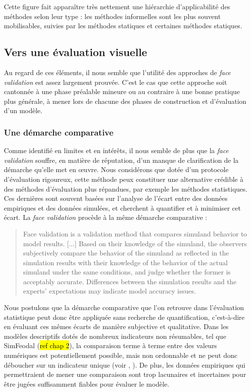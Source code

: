 Cette figure fait apparaître très nettement une \og hiérarchie\fg{} d'applicabilité des méthodes selon leur type : les méthodes informelles sont les plus souvent mobilisables, suivies par les méthodes statiques et certaines méthodes statiques.

\subsection{Vers une évaluation visuelle}

Au regard de ces éléments, il nous semble que l'utilité des approches de \textit{face validation} est assez largement prouvée.
C'est le cas que cette approche soit cantonnée à une phase préalable mineure ou au contraire à une bonne pratique plus générale, à mener lors de chacune des phases de construction et d'évaluation d'un modèle.

\subsubsection{Une démarche comparative}
Comme identifié en limites et en intérêts, il nous semble de plus que la \textit{face validation} souffre, en matière de réputation, d'un manque de clarification de la démarche qu'elle met en œuvre.
Nous considérons que dotée d'un protocole d'évaluation rigoureux, cette méthode peux constituer une alternative crédible à des méthodes d'évaluation plus répandues, par exemple les méthodes statistiques.
Ces dernières sont souvent basées sur l'analyse de l'écart entre des données empiriques et des données simulées, et cherchent à quantifier et à minimiser cet écart.
La \textit{face validation} procède à la même démarche comparative :
\begin{quotation}
		\noindent \og Face validation is a validation method that compares simuland behavior to model results. [...] Based on their knowledge of the simuland, the observers subjectively compare the behavior of the simuland as reflected in the simulation results with their knowledge of the behavior of the actual simuland under the same conditions, and judge whether the former is acceptably accurate. Differences between the simulation results and the experts' expectations may indicate model accuracy issues.
	\mbox{}~ \hfill \textcite[341]{petty2010verification}
\end{quotation}
Nous postulons que la démarche comparative que l'on retrouve dans l'évaluation statistique peut donc être appliquée sans recherche de quantification, c'est-à-dire en évaluant ces mêmes écarts de manière subjective et qualitative.
Dans les modèles descriptifs dotés de nombreux indicateurs non résumables, tel que SimFeodal (\hl{ref chap 2}), la comparaison terme à terme entre des valeurs numériques est potentiellement possible, mais non ordonnable et ne peut donc déboucher sur un indicateur unique (voir , ).
De plus, les données empiriques qui permettraient de mener une comparaison sont trop lacunaires et incertaines pour être jugées suffisamment fiables pour évaluer le modèle.

